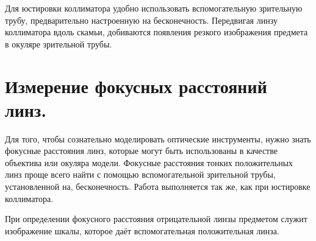 \documentclass[a4paper, 12pt]{article}%
\begin{document}
	Для юстировки коллиматора удобно использовать вспомогательную зрительную трубу, предварительно настроенную на бесконечность. Передвигая
	линзу коллиматора вдоль скамьи, добиваются появления резкого изображения предмета в окуляре зрительной трубы.
	
	\section*{Измерение фокусных расстояний линз.} Для того, чтобы сознательно
	моделировать оптические инструменты, нужно знать фокусные расстояния
	линз, которые могут быть использованы в качестве объектива или окуляра модели. Фокусные расстояния тонких положительных линз проще всего
	найти с помощью вспомогательной зрительной трубы, установленной на, бесконечность. Работа выполняется так же, как при юстировке коллиматора.
	
	При определении фокусного расстояния отрицательной линзы предметом
	служит изображение шкалы, которое даёт вспомогательная положительная
	линза.	
		
\end{document}
